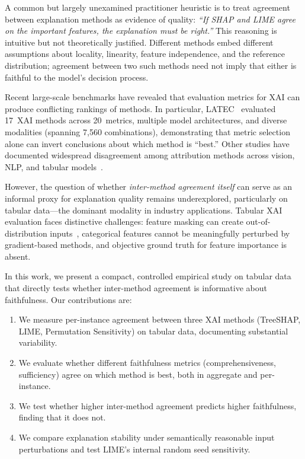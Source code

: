 \documentclass[conference, 10pt]{IEEEtran}
\begin{document}
A common but largely unexamined practitioner heuristic is to treat agreement between explanation methods as evidence of quality: \emph{``If SHAP and LIME agree on the important features, the explanation must be right.''} This reasoning is intuitive but not theoretically justified. Different methods embed different assumptions about locality, linearity, feature independence, and the reference distribution; agreement between two such methods need not imply that either is faithful to the model's decision process.

Recent large-scale benchmarks have revealed that evaluation metrics for XAI can produce conflicting rankings of methods. In particular, LATEC~\cite{hedstrom2024latec} evaluated 17~XAI methods across 20~metrics, multiple model architectures, and diverse modalities (spanning 7,560 combinations), demonstrating that metric selection alone can invert conclusions about which method is ``best.'' Other studies have documented widespread disagreement among attribution methods across vision, NLP, and tabular models~\cite{krishna2022disagreement, zhou2022feature}.

However, the question of whether \emph{inter-method agreement itself} can serve as an informal proxy for explanation quality remains underexplored, particularly on tabular data---the dominant modality in industry applications. Tabular XAI evaluation faces distinctive challenges: feature masking can create out-of-distribution inputs~\cite{hooker2019benchmark}, categorical features cannot be meaningfully perturbed by gradient-based methods, and objective ground truth for feature importance is absent.

In this work, we present a compact, controlled empirical study on tabular data that directly tests whether inter-method agreement is informative about faithfulness. Our contributions are:

\begin{enumerate}[leftmargin=*]
    \item We measure per-instance agreement between three XAI methods (TreeSHAP, LIME, Permutation Sensitivity) on tabular data, documenting substantial variability.
    \item We evaluate whether different faithfulness metrics (comprehensiveness, sufficiency) agree on which method is best, both in aggregate and per-instance.
    \item We test whether higher inter-method agreement predicts higher faithfulness, finding that it does not.
    \item We compare explanation stability under semantically reasonable input perturbations and test LIME's internal random seed sensitivity.
\end{enumerate}
\end{document}
